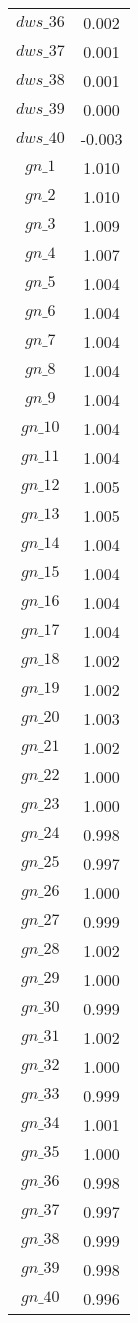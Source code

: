 \begin{center}
\begin{longtable}{cc}
$dws\_36$ 	 & 	 0.002 \\
$dws\_37$ 	 & 	 0.001 \\
$dws\_38$ 	 & 	 0.001 \\
$dws\_39$ 	 & 	 0.000 \\
$dws\_40$ 	 & 	 -0.003 \\
$gn\_1$ 	 & 	 1.010 \\
$gn\_2$ 	 & 	 1.010 \\
$gn\_3$ 	 & 	 1.009 \\
$gn\_4$ 	 & 	 1.007 \\
$gn\_5$ 	 & 	 1.004 \\
$gn\_6$ 	 & 	 1.004 \\
$gn\_7$ 	 & 	 1.004 \\
$gn\_8$ 	 & 	 1.004 \\
$gn\_9$ 	 & 	 1.004 \\
$gn\_10$ 	 & 	 1.004 \\
$gn\_11$ 	 & 	 1.004 \\
$gn\_12$ 	 & 	 1.005 \\
$gn\_13$ 	 & 	 1.005 \\
$gn\_14$ 	 & 	 1.004 \\
$gn\_15$ 	 & 	 1.004 \\
$gn\_16$ 	 & 	 1.004 \\
$gn\_17$ 	 & 	 1.004 \\
$gn\_18$ 	 & 	 1.002 \\
$gn\_19$ 	 & 	 1.002 \\
$gn\_20$ 	 & 	 1.003 \\
$gn\_21$ 	 & 	 1.002 \\
$gn\_22$ 	 & 	 1.000 \\
$gn\_23$ 	 & 	 1.000 \\
$gn\_24$ 	 & 	 0.998 \\
$gn\_25$ 	 & 	 0.997 \\
$gn\_26$ 	 & 	 1.000 \\
$gn\_27$ 	 & 	 0.999 \\
$gn\_28$ 	 & 	 1.002 \\
$gn\_29$ 	 & 	 1.000 \\
$gn\_30$ 	 & 	 0.999 \\
$gn\_31$ 	 & 	 1.002 \\
$gn\_32$ 	 & 	 1.000 \\
$gn\_33$ 	 & 	 0.999 \\
$gn\_34$ 	 & 	 1.001 \\
$gn\_35$ 	 & 	 1.000 \\
$gn\_36$ 	 & 	 0.998 \\
$gn\_37$ 	 & 	 0.997 \\
$gn\_38$ 	 & 	 0.999 \\
$gn\_39$ 	 & 	 0.998 \\
$gn\_40$ 	 & 	 0.996 \\
\bottomrule%
\end{longtable}
\end{center}
